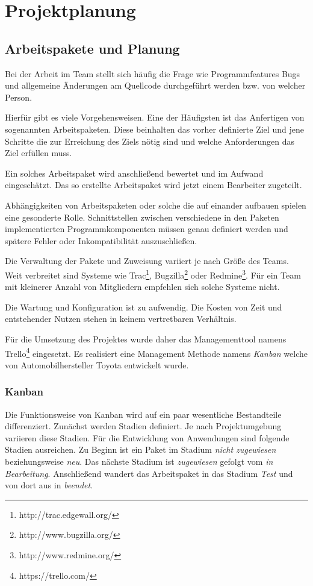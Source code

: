 \section{Projektplanung}
\label{proj}

\subsection{Arbeitspakete und Planung}

Bei der Arbeit im Team stellt sich häufig die Frage wie Programmfeatures Bugs und allgemeine Änderungen am Quellcode durchgeführt werden bzw. von welcher Person.

Hierfür gibt es viele Vorgehensweisen. Eine der Häufigsten ist das Anfertigen von sogenannten Arbeitspaketen. Diese beinhalten das vorher definierte Ziel und jene Schritte die zur Erreichung des Ziels nötig sind und welche Anforderungen das Ziel erfüllen muss.

Ein solches Arbeitspaket wird anschließend bewertet und im Aufwand eingeschätzt. Das so erstellte Arbeitspaket wird jetzt einem Bearbeiter zugeteilt.

Abhängigkeiten von Arbeitspaketen oder solche die auf einander aufbauen spielen eine gesonderte Rolle. Schnittstellen zwischen verschiedene in den Paketen implementierten Programmkomponenten müssen genau definiert werden und spätere Fehler oder Inkompatibilität auszuschließen.

Die Verwaltung der Pakete und Zuweisung variiert je nach Größe des Teams. Weit verbreitet sind Systeme wie Trac\footnote{http://trac.edgewall.org/}, Bugzilla\footnote{http://www.bugzilla.org/} oder Redmine\footnote{http://www.redmine.org/}. Für ein Team mit kleinerer Anzahl von Mitgliedern empfehlen sich solche Systeme nicht.

Die Wartung und Konfiguration ist zu aufwendig. Die Kosten von Zeit und entstehender Nutzen stehen in keinem vertretbaren Verhältnis.

Für die Umsetzung des Projektes wurde daher das Managementtool namens Trello\footnote{https://trello.com/} eingesetzt. Es realisiert eine Management Methode namens \textit{Kanban} welche von Automobilhersteller Toyota entwickelt wurde.

\subsubsection{Kanban}

Die Funktionsweise von Kanban wird auf ein paar wesentliche Bestandteile differenziert. Zunächst werden Stadien definiert. Je nach Projektumgebung variieren diese Stadien. Für die Entwicklung von Anwendungen sind folgende Stadien ausreichen. Zu Beginn ist ein Paket im Stadium \textit{nicht zugewiesen} beziehungsweise \textit{neu}. Das nächste Stadium ist \textit{zugewiesen} gefolgt vom \textit{in Bearbeitung}. Anschließend wandert das Arbeitspaket in das Stadium \textit{Test} und von dort aus in \textit{beendet}.

